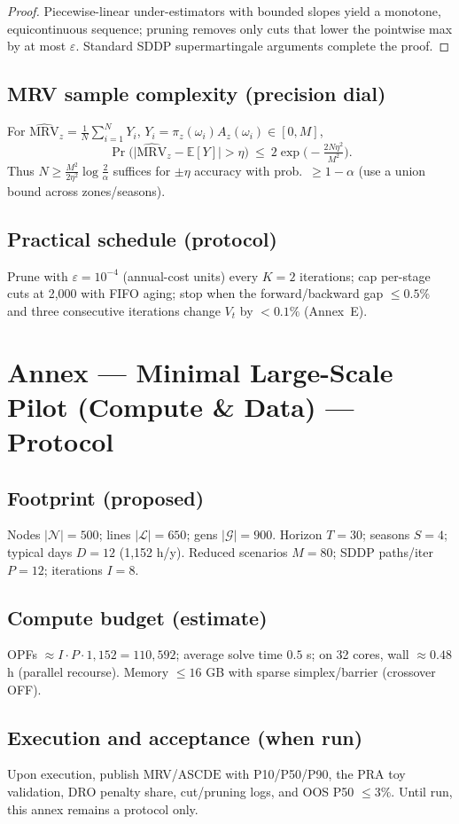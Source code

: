 \documentclass[11pt]{article}
\newcommand{\annexsection}[1]{\section{Annex \thesection{} — #1}}
\newcommand{\ASCDE}{\ensuremath{\mathrm{ASCDE}}}
\numberwithin{equation}{section}
\theoremstyle{definition}
\theoremstyle{remark}
\begin{document}
\begin{proof}
Piecewise-linear under-estimators with bounded slopes yield a monotone, equicontinuous sequence; pruning removes only cuts that lower the pointwise max by at most $\varepsilon$. Standard SDDP supermartingale arguments complete the proof.
\end{proof}

\subsection{ MRV sample complexity (precision dial)}
For $\widehat{\mathrm{MRV}}_z=\frac{1}{N}\sum_{i=1}^N Y_i$, $Y_i=\pi_{z}(\omega_i)A_{z}(\omega_i)\in[0,M]$,
\[
\Pr\!\Big(\big|\widehat{\mathrm{MRV}}_z-\mathbb{E}[Y]\big|>\eta\Big)\ \le\ 2\exp\!\Big(-\tfrac{2N\eta^2}{M^2}\Big).
\]
Thus $N \ge \frac{M^2}{2\eta^2}\log\frac{2}{\alpha}$ suffices for $\pm\eta$ accuracy with prob.\ $\ge 1-\alpha$ (use a union bound across zones/seasons).

\subsection{ Practical schedule (protocol)}
Prune with $\varepsilon=10^{-4}$ (annual-cost units) every $K=2$ iterations; cap per-stage cuts at 2,000 with FIFO aging; stop when the forward/backward gap $\le 0.5\%$ and three consecutive iterations change $V_t$ by $<0.1\%$ (Annex~E).

\annexsection{Minimal Large-Scale Pilot (Compute \& Data) — Protocol}
\label{annex:S}

\subsection{Footprint (proposed)}
Nodes $|\mathcal N|=500$; lines $|\mathcal L|=650$; gens $|\mathcal G|=900$.
Horizon $T=30$; seasons $S=4$; typical days $D=12$ (1,152 h/y).
Reduced scenarios $M=80$; SDDP paths/iter $P=12$; iterations $I=8$.

\subsection{ Compute budget (estimate)}
OPFs $\approx I\cdot P\cdot 1{,}152 = 110{,}592$; average solve time $0.5$ s;
on 32 cores, wall $\approx 0.48$ h (parallel recourse). Memory $\le 16$ GB with sparse simplex/barrier (crossover OFF).

\subsection{Execution and acceptance (when run)}
Upon execution, publish MRV/\ASCDE{} with P10/P50/P90, the PRA toy validation, DRO penalty share, cut/pruning logs, and OOS P50 $\le 3\%$. Until run, this annex remains a protocol only.
\end{document}
